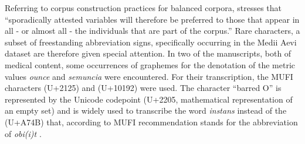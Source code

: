 \documentclass{article}
\newcommand{\juni}[1]{\textsf{\junicodeFont #1}}%
\begin{document}
Referring to corpus construction practices for balanced corpora, \cite{maniaci1993che} stresses that \enquote{sporadically attested variables will therefore be preferred to those that appear in all - or almost all - the individuals that are part of the corpus.} Rare characters, a subset of freestanding abbreviation signs, specifically occurring in the Medii Aevi dataset are therefore given special attention. In two of the manuscripts, both of medical content, some occurrences of graphemes for the denotation of the metric values \textit{ounce} and \textit{semuncia} were encountered. For their transcription, the MUFI characters \juni{} (U+2125) and \juni{} (U+10192) were used. The character \enquote{barred O} is represented by the Unicode codepoint \juni{} (U+2205, mathematical representation of an empty set) and is widely used to transcribe the word \textit{instans} instead of the \juni{} (U+A74B) that, according to MUFI recommendation stands for the abbreviation of \textit{obi(i)t} \cite[p.~10]{coulson2020oxford}.
\end{document}
